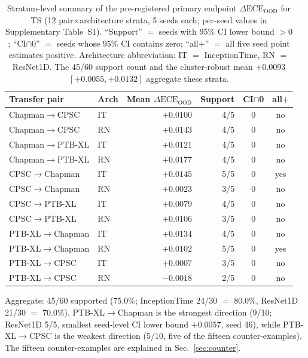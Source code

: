 \documentclass[review,12pt,nonatbib]{elsarticle}
\begin{document}
\begin{table}[tb]
\centering
\caption{Stratum-level summary of the pre-registered primary endpoint
$\Delta\text{ECE}_{\text{OOD}}$ for TS (12 pair$\times$architecture
strata, 5 seeds each; per-seed values in Supplementary Table~S1).
``Support'' $=$ seeds with 95\% CI lower bound $>0$; ``CI$\cap$0'' $=$
seeds whose 95\% CI contains zero; ``all$+$'' $=$ all five seed point
estimates positive. Architecture abbreviation: IT $=$ InceptionTime,
RN $=$ ResNet1D. The 45/60 support count and the cluster-robust mean
$+0.0093$ $[+0.0055,+0.0132]$ aggregate these strata.}
\label{tab:stratum_summary}
\begin{tabular}{llrrcc}
\toprule
Transfer pair & Arch & Mean $\Delta\text{ECE}_{\text{OOD}}$ & Support & CI$\cap$0 & all$+$ \\
\midrule
Chapman$\rightarrow$CPSC & IT & $+0.0100$ & 4/5 & 0 & no \\
Chapman$\rightarrow$CPSC & RN & $+0.0143$ & 4/5 & 0 & no \\
Chapman$\rightarrow$PTB-XL & IT & $+0.0121$ & 4/5 & 0 & no \\
Chapman$\rightarrow$PTB-XL & RN & $+0.0177$ & 4/5 & 0 & no \\
CPSC$\rightarrow$Chapman & IT & $+0.0145$ & 5/5 & 0 & yes \\
CPSC$\rightarrow$Chapman & RN & $+0.0023$ & 3/5 & 0 & no \\
CPSC$\rightarrow$PTB-XL & IT & $+0.0079$ & 4/5 & 0 & no \\
CPSC$\rightarrow$PTB-XL & RN & $+0.0106$ & 3/5 & 0 & no \\
PTB-XL$\rightarrow$Chapman & IT & $+0.0134$ & 4/5 & 0 & no \\
PTB-XL$\rightarrow$Chapman & RN & $+0.0102$ & 5/5 & 0 & yes \\
PTB-XL$\rightarrow$CPSC & IT & $+0.0007$ & 3/5 & 0 & no \\
PTB-XL$\rightarrow$CPSC & RN & $-0.0018$ & 2/5 & 0 & no \\
\bottomrule
\end{tabular}
\end{table}


Aggregate: 45/60 supported (75.0\%; InceptionTime 24/30 $=$
80.0\%, ResNet1D 21/30 $=$ 70.0\%). PTB-XL$\rightarrow$Chapman is the
strongest direction (9/10; ResNet1D 5/5, smallest seed-level CI lower
bound $+0.0057$, seed 46), while PTB-XL$\rightarrow$CPSC is the weakest
direction (5/10, five of the fifteen counter-examples). The fifteen
counter-examples are explained in Sec.~\ref{sec:counter}.
\end{document}

